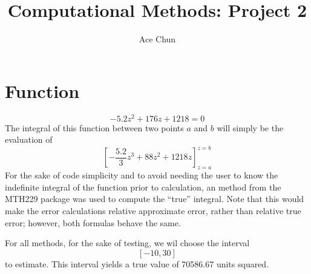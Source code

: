 \documentclass[12pt]{article}
\title{Computational Methods: Project 2}
\author{Ace Chun}
\begin{document}
\maketitle

\section{Function}
    \[-5.2z^2 + 176z + 1218 = 0\]
    The integral of this function between two points $a$ and $b$ will simply be the evaluation of 
    \[\left[-\frac{5.2}{3}z^3 + 88z^2 + 1218z\right]^{z = b}_{z = a}\]
    For the sake of code simplicity and to avoid needing the user to know the indefinite integral of the function 
    prior to calculation, an method from the MTH229 package was used to compute the ``true'' integral. Note that this would make 
    the error calculations relative approximate error, rather than relative true error; however, both formulas behave the same.

    For all methods, for the sake of testing, we wil choose the interval 
    \[[-10, 30]\]
    to estimate. This interval yields a true value of 70586.67 units squared.
\end{document}
